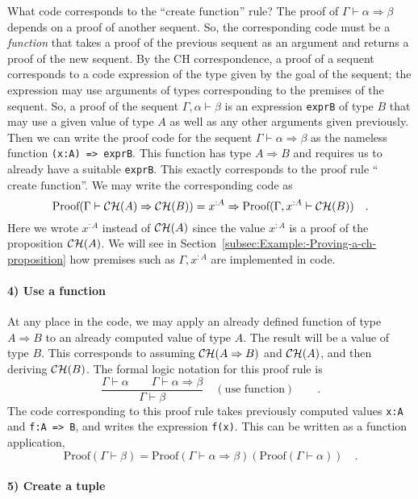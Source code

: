 What code corresponds to the ``$\text{create function}$'' rule?
The proof of $\Gamma\vdash\alpha\Rightarrow\beta$ depends on a proof
of another sequent. So, the corresponding code must be a \emph{function}
that takes a proof of the previous sequent as an argument and returns
a proof of the new sequent. By the CH correspondence, a proof of a
sequent corresponds to a code expression of the type given by the
goal of the sequent; the expression may use arguments of types corresponding
to the premises of the sequent. So, a proof of the sequent $\Gamma,\alpha\vdash\beta$
is an expression \lstinline!exprB! of type $B$ that may use a given
value of type $A$ as well as any other arguments given previously.
Then we can write the proof code for the sequent $\Gamma\vdash\alpha\Rightarrow\beta$
as the nameless function \lstinline!(x:A) => exprB!. This function
has type $A\Rightarrow B$ and requires us to already have a suitable
\lstinline!exprB!. This exactly corresponds to the proof rule ``$\text{create function}$''.
We may write the corresponding code as
\[
\text{Proof}(\Gamma\vdash{\cal CH}(A)\Rightarrow{\cal CH}(B))=x^{:A}\Rightarrow\text{Proof}(\Gamma,x^{:A}\vdash{\cal CH}(B))\quad.
\]
Here we wrote $x^{:A}$ instead of ${\cal CH}(A)$ since the value
$x^{:A}$ is a proof of the proposition ${\cal CH}(A)$. We will see
in Section~\ref{subsec:Example:-Proving-a-ch-proposition} how premises
such as $\Gamma,x^{:A}$ are implemented in code.

\paragraph{4) Use a function}

At any place in the code, we may apply an already defined function
of type $A\Rightarrow B$ to an already computed value of type $A$.
The result will be a value of type $B$. This corresponds to assuming
${\cal CH}(A\Rightarrow B)$ and ${\cal CH}(A)$, and then deriving
${\cal CH}(B)$. The formal logic notation for this proof rule is
\[
\frac{\Gamma\vdash\alpha\quad\quad\Gamma\vdash\alpha\Rightarrow\beta}{\Gamma\vdash\beta}\quad(\text{use function})\quad\quad.
\]
The code corresponding to this proof rule takes previously computed
values \lstinline!x:A! and \lstinline!f:A => B!, and writes the
expression \lstinline!f(x)!. This can be written as a function application,
\[
\text{Proof}(\Gamma\vdash\beta)=\text{Proof}\left(\Gamma\vdash\alpha\Rightarrow\beta\right)(\text{Proof}(\Gamma\vdash\alpha))\quad.
\]


\paragraph{5) Create a tuple}

